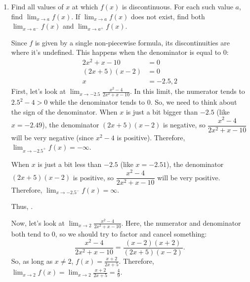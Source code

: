 \documentclass{article}
\newenvironment{noanswer}{}{}
\theoremstyle{theorem}
\begin{document}
\begin{enumerate}
\begin{enumerate}
  \item
    \begin{problem}[\vfill]
      Find all values of $x$ at which $f(x)$ is discontinuous. For each such value $a$, find $\displaystyle \lim_{x \to a} f(x)$. If $\displaystyle \lim_{x \to a} f(x)$ does not exist, find both $\displaystyle \lim_{x \to a^-} f(x)$ and $\displaystyle \lim_{x \to a^+} f(x)$. 
    \end{problem}

    \begin{solution}
      Since $f$ is given by a single non-piecewise formula, its discontinuities are where it's undefined. This happens when the denominator is equal to 0:
      \begin{align*}
        2x^2 + x - 10 &= 0 \\
        (2x + 5)(x - 2) &= 0 \\
        x &= -2.5, 2
      \end{align*}
      First, let's look at $\displaystyle \lim_{x \to -2.5} \frac{x^2 - 4}{2x^2 + x - 10}$. In this limit, the numerator tends to $2.5^2 - 4 > 0$ while the denominator tends to 0. So, we need to think about the sign of the denominator. When $x$ is just a bit bigger than $-2.5$ (like $x = -2.49$), the denominator $(2x + 5)(x - 2)$ is negative, so $\dfrac{x^2 - 4}{2x^2 + x - 10}$ will be very negative (since $x^2 - 4$ is positive). Therefore, $\displaystyle \boxed{\lim_{x \to -2.5^+} f(x) = -\infty}$.

      When $x$ is just a bit less than $-2.5$ (like $x = -2.51$), the denominator $(2x + 5)(x - 2)$ is positive, so $\dfrac{x^2 - 4}{2x^2 + x - 10}$ will be very positive. Therefore, $\displaystyle \boxed{\lim_{x \to -2.5^-} f(x) = \infty}$.

      Thus, .

      \begin{noanswer}
      Now, let's look at $\displaystyle \lim_{x \to 2} \frac{x^2 - 4}{2x^2 + x - 10}$. Here, the numerator and denominator both tend to 0, so we should try to factor and cancel something:
      \[ \frac{x^2 - 4}{2x^2 + x - 10} = \frac{(x - 2)(x + 2)}{(2x + 5)(x - 2)}.\]
      So, as long as $x \neq 2$, $\displaystyle f(x) = \frac{x + 2}{2x + 5}$. Therefore, $\boxed{\lim_{x \to 2} f(x) = \lim_{x \to 2} \frac{x + 2}{2x + 5} = \frac{4}{9}}$.
      \end{noanswer}
    \end{solution}


\end{enumerate}
\end{enumerate}
\end{document}
